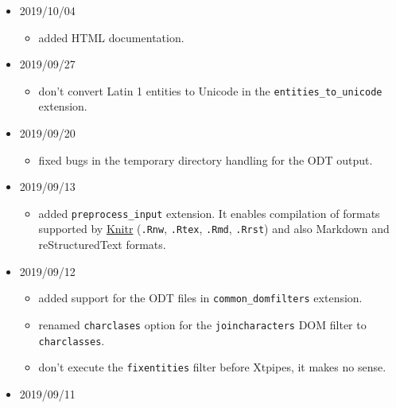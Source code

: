 \begin{itemize}
  \begin{itemize}
  \tightlist
  \item
    don't move the \texttt{common\_domfilters} extension to the first
    place in the file matches pipeline. We may want to run \texttt{tidy}
    or regex filters first, to fix XML validation errors.
  \end{itemize}
\item
  2019/10/04

  \begin{itemize}
  \tightlist
  \item
    added HTML documentation.
  \end{itemize}
\item
  2019/09/27

  \begin{itemize}
  \tightlist
  \item
    don't convert Latin 1 entities to Unicode in the
    \texttt{entities\_to\_unicode} extension.
  \end{itemize}
\item
  2019/09/20

  \begin{itemize}
  \tightlist
  \item
    fixed bugs in the temporary directory handling for the ODT output.
  \end{itemize}
\item
  2019/09/13

  \begin{itemize}
  \tightlist
  \item
    added \texttt{preprocess\_input} extension. It enables compilation
    of formats supported by \href{https://yihui.name/knitr/}{Knitr}
    (\texttt{.Rnw}, \texttt{.Rtex}, \texttt{.Rmd}, \texttt{.Rrst}) and
    also Markdown and reStructuredText formats.
  \end{itemize}
\item
  2019/09/12

  \begin{itemize}
  \tightlist
  \item
    added support for the ODT files in \texttt{common\_domfilters}
    extension.
  \item
    renamed \texttt{charclases} option for the \texttt{joincharacters}
    DOM filter to \texttt{charclasses}.
  \item
    don't execute the \texttt{fixentities} filter before Xtpipes, it
    makes no sense.
  \end{itemize}
\item
  2019/09/11


\end{itemize}
